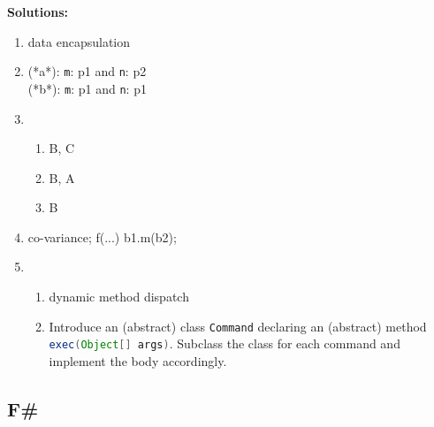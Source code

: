 \documentclass{article}
\newcommand{\solution}[1] {\textbf{Solutions:}\\ #1}
\begin{document}
\solution{
\begin{enumerate}
  \item data encapsulation
  \item (*a*): \texttt{m}: p1 and \texttt{n}: p2\\
        (*b*): \texttt{m}: p1 and \texttt{n}: p1 
  \item \begin{enumerate}
           \item B, C
           \item B, A
           \item B
        \end{enumerate}
  \item co-variance; f(...) { b1.m(b2); }
  \item \begin{enumerate}
    \item dynamic method dispatch
    \item Introduce an (abstract) class \lstinline[language=Java,
      columns=flexible]{Command} declaring an (abstract) method
      \lstinline[language=Java, columns=flexible]{exec(Object[] args)}.
      Subclass the class for each command and implement the body
      accordingly. 
    \end{enumerate}
\end{enumerate}
}

\subsection{F\#}
\end{document}
